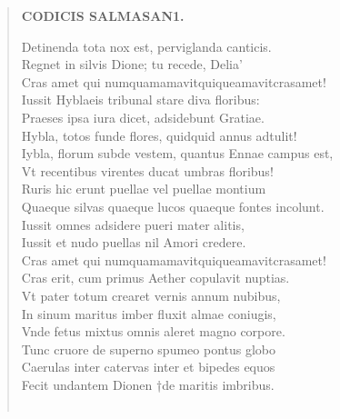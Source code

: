 \documentclass[11pt, a4paper]{report}
\begin{document}
\begin{verse}
    \begin{center} \textbf{CODICIS SALMASAN1.} \end{center} \marginpar{[173]} Detinenda tota nox est, perviglanda canticis. \\ Regnet in silvis Dione; tu recede, Delia’ \\ Cras amet qui numquamamavitquiqueamavitcrasamet! \\ Iussit Hyblaeis tribunal stare diva floribus: \\ Praeses ipsa iura dicet, adsidebunt Gratiae. \\ Hybla, totos funde flores, quidquid annus adtulit! \\ Iybla, florum subde vestem, quantus Ennae campus est, \\ Vt recentibus virentes ducat umbras floribus! \\ Ruris hic erunt puellae vel puellae montium \\ Quaeque silvas quaeque lucos quaeque fontes incolunt. \\ Iussit omnes adsidere pueri mater alitis, \\ Iussit et nudo puellas nil Amori credere. \\ Cras amet qui numquamamavitquiqueamavitcrasamet! \\ Cras erit, cum primus Aether copulavit nuptias. \\ Vt pater totum crearet vernis annum nubibus, \\ In sinum maritus imber fluxit almae coniugis, \\ Vnde fetus mixtus omnis aleret magno corpore. \\ Tunc cruore de superno spumeo pontus globo \\ Caerulas inter catervas inter et bipedes equos \\ Fecit undantem Dionen †de maritis imbribus. \\ 
        ﻿\pagebreak 
    
      \end{verse}
  
\end{document}

